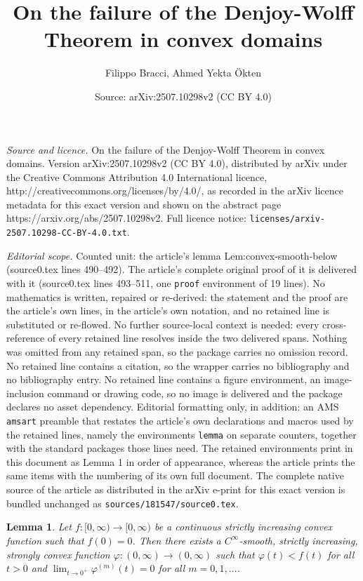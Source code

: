 \documentclass[10pt,a4paper]{amsart}
\title{On the failure of the Denjoy-Wolff Theorem in convex domains}
\author{Filippo Bracci, Ahmed Yekta \"Okten}
\date{Source: arXiv:2507.10298v2 (CC BY 4.0)}
\newtheorem{lemma}{Lemma}
\begin{document}
\maketitle

\noindent\emph{Source and licence.} On the failure of the Denjoy-Wolff Theorem in convex domains. Version arXiv:2507.10298v2 (CC BY 4.0), distributed by arXiv under the Creative Commons Attribution 4.0 International licence, http://creativecommons.org/licenses/by/4.0/, as recorded in the arXiv licence metadata for this exact version and shown on the abstract page https://arxiv.org/abs/2507.10298v2. Full licence notice: \texttt{licenses/arxiv-2507.10298-CC-BY-4.0.txt}.\par\smallskip

\noindent\textit{Editorial scope.} Counted unit: the article's lemma Lem:convex-smooth-below (source0.tex lines 490--492). The article's complete original proof of it is delivered with it (source0.tex lines 493--511, one \texttt{proof} environment of 19 lines). No mathematics is written, repaired or re-derived: the statement and the proof are the article's own lines, in the article's own notation, and no retained line is substituted or re-flowed.  No further source-local context is needed: every cross-reference of every retained line resolves inside the two delivered spans.  Nothing was omitted from any retained span, so the package carries no omission record.  No retained line contains a citation, so the wrapper carries no bibliography and no bibliography entry.  No retained line contains a figure environment, an image-inclusion command or drawing code, so no image is delivered and the package declares no asset dependency.  Editorial formatting only, in addition: an AMS \texttt{amsart} preamble that restates the article's own declarations and macros used by the retained lines, namely the environments \texttt{lemma} on separate counters, together with the standard packages those lines need.  The retained environments print in this document as Lemma 1 in order of appearance, whereas the article prints the same items with the numbering of its own full document.  The complete native source of the article as distributed in the arXiv e-print for this exact version is bundled unchanged as \texttt{sources/181547/source0.tex}.
\begin{lemma}\label{Lem:convex-smooth-below}
{Let $f:[0,\infty)\to [0,\infty)$ be a continuous strictly increasing convex function such that $f(0)=0$. Then there exists a $C^\infty$-smooth, strictly increasing, strongly convex function $\varphi:(0,\infty)\to (0,\infty)$ such that $\varphi(t)<f(t)$ for all $t>0$ and $\lim_{t\to 0^+}\varphi^{(m)}(t)=0$ for all $m=0,1,\ldots$.}
\end{lemma}
\end{document}
